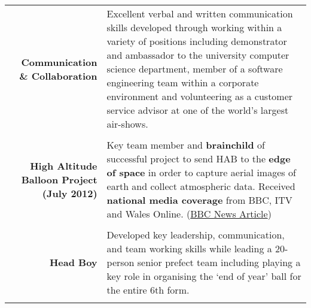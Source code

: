 \documentclass[a4paper, 10pt]{extarticle} %
\begin{document}
\begin{small}
\begin{tabular}{r | p{12cm}}
	\begin{minipage}[t]{2.5cm}
		\begin{flushright}
			\textbf{Communication \& Collaboration}
		\end{flushright}
	\end{minipage} 
		
		& 
		
		Excellent verbal and written communication skills developed through working within a variety of positions including demonstrator and ambassador to the university computer science department, member of a software engineering team within a corporate environment and volunteering as a customer service advisor at one of the world's largest air-shows. \\
		
		\multicolumn{2}{c}{} \\
		
			\begin{minipage}[t]{2.5cm}
		\begin{flushright}
			\textbf{High Altitude Balloon Project (July 2012)}
		\end{flushright}
	\end{minipage} 
		
		& 
		
		Key team member and \textbf{brainchild} of successful project to send HAB to the \textbf{edge of space} in order to capture aerial images of earth and collect atmospheric data. Received \textbf{national media coverage} from BBC, ITV and Wales Online. (\href{http://www.bbc.co.uk/news/uk-wales-south-west-wales-18793717}{BBC News Article}) \\
		
		\multicolumn{2}{c}{} \\
			
	\begin{minipage}[t]{2.5cm}
		\begin{flushright}
			\textbf{Head Boy}
		\end{flushright}
		\end{minipage} 
		
		& 
		
		Developed key leadership, communication, and team working skills while leading a 20-person senior prefect team including playing a key role in organising the `end of year' ball for the entire 6th form. \\

	\multicolumn{2}{c}{} \\
	

\end{tabular}
\end{small}
\end{document}
